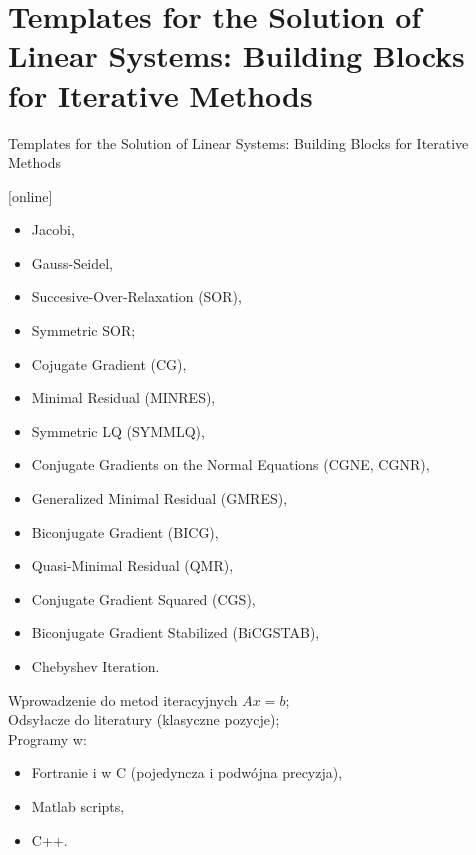 \section{Templates for the Solution of Linear Systems: Building Blocks for Iterative Methods}
	\begin{frame}[allowframebreaks]{Templates for the Solution of Linear Systems: Building Blocks for Iterative Methods}
		\begin{thebibliography}{9}
		\end{thebibliography}
		
		
		\begin{itemize}
			\item Jacobi,
			\item Gauss-Seidel,
			\item Succesive-Over-Relaxation (SOR),
			\item Symmetric SOR;
			\item Cojugate Gradient (CG),
			\item Minimal Residual (MINRES),
			\item Symmetric LQ (SYMMLQ),
			\item Conjugate Gradients on the Normal Equations (CGNE, CGNR),
			\item Generalized Minimal Residual (GMRES),
			\item Biconjugate Gradient (BICG),
			\item Quasi-Minimal Residual (QMR),
			\item Conjugate Gradient Squared (CGS),
			\item Biconjugate Gradient Stabilized (BiCGSTAB),
			\item Chebyshev Iteration.
		\end{itemize}
		Wprowadzenie do metod iteracyjnych $Ax = b$; \\
		Odsyłacze do literatury (klasyczne pozycje); \\
		Programy w:
		\begin{itemize}
			\item Fortranie i w C (pojedyncza i podwójna precyzja),
			\item Matlab scripts,
			\item C++.
		\end{itemize}
	\end{frame}